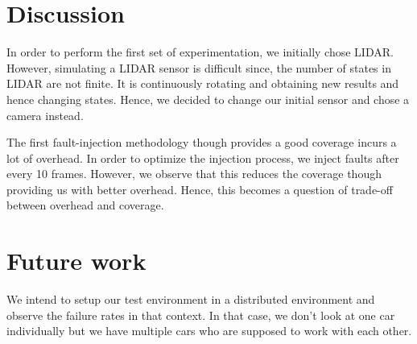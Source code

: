  \section{Discussion}
In order to perform the first set of experimentation, we initially chose LIDAR. However, simulating a LIDAR sensor is difficult since, the number of states in LIDAR are not finite. It is continuously rotating and obtaining new results and hence changing states. Hence, we decided to change our initial sensor and chose a camera instead.

The first fault-injection methodology though provides a good coverage incurs a lot of overhead. In order to optimize the injection process, we inject faults after every 10 frames. However, we observe that this reduces the coverage though providing us with better overhead. Hence, this becomes a question of trade-off between overhead and coverage. 



\section{Future work}
We intend to setup our test environment in a distributed environment and observe the failure rates in that context. In that case, we don't look at one car individually but we have multiple cars who are supposed to work with each other.

